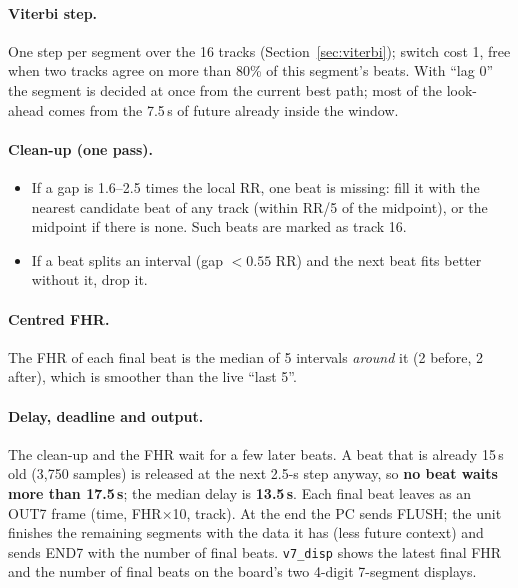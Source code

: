 \documentclass[11pt]{article}
\newcommand{\ttt}[1]{\texttt{#1}}
\begin{document}
\paragraph{Viterbi step.} One step per segment over the 16 tracks (Section~\ref{sec:viterbi}); switch cost 1, free when two tracks agree on more than 80\% of this segment's beats. With ``lag 0'' the segment is decided at once from the current best path; most of the look-ahead comes from the 7.5\,s of future already inside the window.

\paragraph{Clean-up (one pass).}
\begin{itemize}
  \item If a gap is 1.6--2.5 times the local RR, one beat is missing: fill it with the nearest candidate beat of any track (within RR/5 of the midpoint), or the midpoint if there is none. Such beats are marked as track 16.
  \item If a beat splits an interval (gap $< 0.55$ RR) and the next beat fits better without it, drop it.
\end{itemize}

\paragraph{Centred FHR.} The FHR of each final beat is the median of 5 intervals \emph{around} it (2 before, 2 after), which is smoother than the live ``last 5''.

\paragraph{Delay, deadline and output.} The clean-up and the FHR wait for a few later beats. A beat that is already 15\,s old (3,750 samples) is released at the next 2.5-s step anyway, so \textbf{no beat waits more than 17.5\,s}; the median delay is \textbf{13.5\,s}. Each final beat leaves as an OUT7 frame (time, FHR$\times$10, track). At the end the PC sends FLUSH; the unit finishes the remaining segments with the data it has (less future context) and sends END7 with the number of final beats. \ttt{v7\_disp} shows the latest final FHR and the number of final beats on the board's two 4-digit 7-segment displays.

\begin{viva}
\end{viva}
\end{document}

